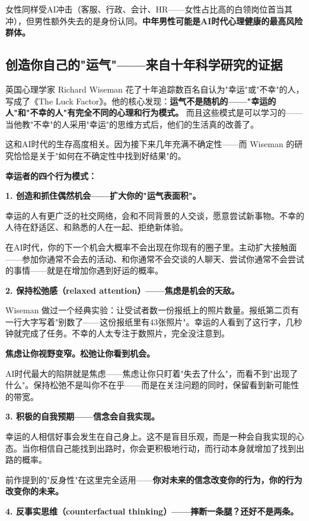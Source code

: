 \documentclass[a4paper,12pt,UTF8]{ctexart}
\begin{document}
女性同样受AI冲击（客服、行政、会计、HR——女性占比高的白领岗位首当其冲），但男性额外失去的是身份认同。\textbf{中年男性可能是AI时代心理健康的最高风险群体。}

\subsection{创造你自己的"运气"——来自十年科学研究的证据}

英国心理学家 Richard Wiseman 花了十年追踪数百名自认为"幸运"或"不幸"的人，写成了《The Luck Factor》。他的核心发现：\textbf{运气不是随机的——"幸运的人"和"不幸的人"有完全不同的心理和行为模式。} 而且这些模式是可以学习的——当他教"不幸"的人采用"幸运"的思维方式后，他们的生活真的改善了。

这和AI时代的生存高度相关。因为接下来几年充满不确定性——而 Wiseman 的研究恰恰是关于"如何在不确定性中找到好结果"的。

\textbf{幸运者的四个行为模式：}

\textbf{1. 创造和抓住偶然机会——扩大你的"运气表面积"。}

幸运的人有更广泛的社交网络，会和不同背景的人交谈，愿意尝试新事物。不幸的人待在舒适区、和熟悉的人在一起、拒绝新体验。

在AI时代，你的下一个机会大概率不会出现在你现有的圈子里。主动扩大接触面——参加你通常不会去的活动、和你通常不会交谈的人聊天、尝试你通常不会尝试的事情——就是在增加你遇到好运的概率。

\textbf{2. 保持松弛感（relaxed attention）——焦虑是机会的天敌。}

Wiseman 做过一个经典实验：让受试者数一份报纸上的照片数量。报纸第二页有一行大字写着"别数了——这份报纸里有43张照片"。幸运的人看到了这行字，几秒钟就完成了任务。不幸的人太专注于数照片，完全没注意到。

\textbf{焦虑让你视野变窄。松弛让你看到机会。}

AI时代最大的陷阱就是焦虑——焦虑让你只盯着"失去了什么"，而看不到"出现了什么"。保持松弛不是叫你不在乎——而是在关注问题的同时，保留看到新可能性的带宽。

\textbf{3. 积极的自我预期——信念会自我实现。}

幸运的人相信好事会发生在自己身上。这不是盲目乐观，而是一种会自我实现的心态。当你相信自己能找到出路时，你会更积极地行动，而行动本身就增加了找到出路的概率。

前作提到的"反身性"在这里完全适用——\textbf{你对未来的信念改变你的行为，你的行为改变你的未来。}

\textbf{4. 反事实思维（counterfactual thinking）——摔断一条腿？还好不是两条。}
\end{document}
